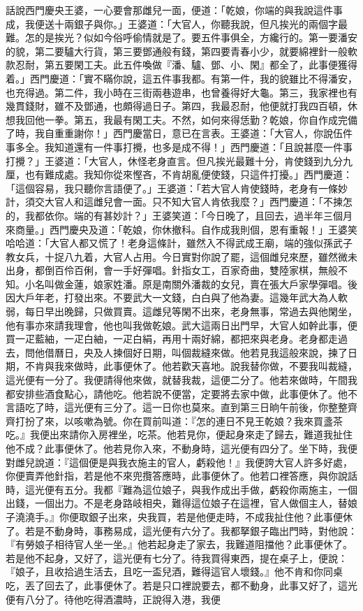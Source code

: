 \begin{showcontents}{}
話說西門慶央王婆，一心要會那雌兒一面，便道：「乾娘，你端的與我說這件事成，我便送十兩銀子與你。」王婆道：「大官人，你聽我說，但凡挨光的兩個字最難。怎的是挨光？似如今俗呼偷情就是了。要五件事俱全，方纔行的。第一要潘安的貌，第二要驢大行貨，第三要鄧通般有錢，第四要青春小少，就要綿裡針一般軟款忍耐，第五要閑工夫。此五件喚做『潘、驢、鄧、小、閑』都全了，此事便獲得着。」西門慶道：「實不瞞你說，這五件事我都。有第一件，我的貌雖比不得潘安，也充得過。第二件，我小時在三街兩巷遊串，也曾養得好大龜。第三，我家裡也有幾貫錢財，雖不及鄧通，也頗得過日子。第四，我最忍耐，他便就打我四百頓，休想我回他一拳。第五，我最有閑工夫。不然，如何來得恁勤？乾娘，你自作成完備了時，我自重重謝你！」西門慶當日，意已在言表。王婆道：「大官人，你說伍件事多全。我知道還有一件事打攪，也多是成不得！」西門慶道：「且說甚麼一件事打攪？」王婆道：「大官人，休怪老身直言。但凡挨光最難十分，肯使錢到九分九厘，也有難成處。我知你從來慳吝，不肯胡亂便使錢，只這件打擾。」西門慶道：「這個容易，我只聽你言語便了。」王婆道：「若大官人肯使錢時，老身有一條妙計，須交大官人和這雌兒會一面。只不知大官人肯依我麼？」西門慶道：「不揀怎的，我都依你。端的有甚妙計？」王婆笑道：「今日晚了，且回去，過半年三個月來商量。」西門慶央及道：「乾娘，你休撤科。自作成我則個，恩有重報！」王婆笑哈哈道：「大官人都又慌了！老身這條計，雖然入不得武成王廟，端的強似孫武子教女兵，十捉八九着，大官人占用。今日實對你說了罷，這個雌兒來歷，雖然微未出身，都倒百伶百俐，會一手好彈唱。針指女工，百家奇曲，雙陸家棋，無般不知。小名叫做金蓮，娘家姓潘。原是南關外潘裁的女兒，賣在張大戶家學彈唱。後因大戶年老，打發出來。不要武大一文錢，白白與了他為妻。這幾年武大為人軟弱，每日早出晚歸，只做買賣。這雌兒等閑不出來，老身無事，常過去與他閑坐，他有事亦來請我理會，他也叫我做乾娘。武大這兩日出門早，大官人如幹此事，便買一疋藍紬，一疋白紬，一疋白絹，再用十兩好綿，都把來與老身。老身都走過去，問他借曆日，央及人揀個好日期，叫個裁縫來做。他若見我這般來說，揀了日期，不肯與我來做時，此事便休了。他若歡天喜地。說我替你做，不要我叫裁縫，這光便有一分了。我便請得他來做，就替我裁，這便二分了。他若來做時，午間我都安排些酒食點心，請他吃。他若說不便當，定要將去家中做，此事便休了。他不言語吃了時，這光便有三分了。這一日你也莫來。直到第三日晌午前後，你整整齊齊打扮了來，以咳嗽為號。你在買前叫道：『怎的連日不見王乾娘？我來買盞茶吃。』我便出來請你入房裡坐，吃茶。他若見你，便起身來走了歸去，難道我扯住他不成？此事便休了。他若見你入來，不動身時，這光便有四分了。坐下時，我便對雌兒說道：『這個便是與我衣施主的官人，虧殺他！』我便誇大官人許多好處，你便賣弄他針指，若是他不來兜攬答應時，此事便休了。他若口裡答應，與你說話時，這光便有五分。我都『難為這位娘子，與我作成出手做，虧殺你兩施主，一個出錢，一個出力。不是老身路岐相央，難得這位娘子在這裡，官人做個主人，替娘子澆澆手。』你便取銀子出來，央我買，若是他便走時，不成我扯住他？此事便休了。若是不動身時，事務易成，這光便有六分了。我都拏銀子臨出門時，對他說：『有勞娘子相待官人坐一坐。』他若起身走了家去，我難道阻擋他？此事便休了。若是他不起身，又好了，這光便有七分了。待我買得東西，提在桌子上，便說：『娘子，且收拾過生活去，且吃一盃兒酒，難得這官人壞錢。』他不肯和你同桌吃，丟了回去了，此事便休了。若是只口裡說要去，都不動身，此事又好了，這光便有八分了。待他吃得酒濃時，正說得入港，我便
\end{showcontents}
